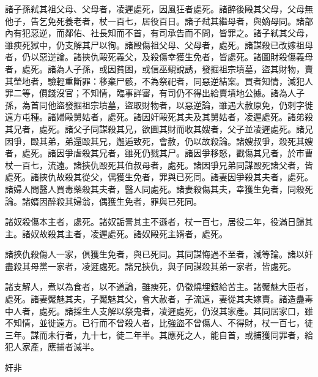 \begin{pinyinscope}
 諸子孫弒其祖父母、父母者，凌遲處死，因風狂者處死。諸醉後毆其父母，父母無他子，告乞免死養老者，杖一百七，居役百日。諸子弒其繼母者，與嫡母同。諸部內有犯惡逆，而鄰佑、社長知而不首，有司承告而不問，皆罪之。諸子弒其父母，雖瘐死獄中，仍支解其尸以徇。諸毆傷祖父母、父母者，處死。諸謀殺已改嫁祖母者，仍以惡逆論。諸挾仇毆死義父，及殺傷幸獲生免者，皆處死。諸圖財殺傷義母者，處死。諸為人子孫，或因貧困，或信巫覡說誘，發掘祖宗墳墓，盜其財物，賣其塋地者，驗輕重斷罪：移棄尸骸，不為祭祀者，同惡逆結案。買者知情，減犯人罪二等，價錢沒官；不知情，臨事詳審，有司仍不得出給賣墳地公據。諸為人子孫，為首同他盜發掘祖宗墳墓，盜取財物者，以惡逆論，雖遇大赦原免，仍刺字徙遠方屯種。諸婦毆舅姑者，處死。諸因奸毆死其夫及其舅姑者，凌遲處死。諸弟殺其兄者，處死。諸父子同謀殺其兄，欲圖其財而收其嫂者，父子並凌遲處死。諸兄因爭，毆其弟，弟還毆其兄，邂逅致死，會赦，仍以故殺論。諸嫂叔爭，殺死其嫂者，處死。諸因爭虐殺其兄者，雖死仍戮其尸。諸因爭移怒，戳傷其兄者，於市曹杖一百七，流遠。諸挾仇毆死其伯叔母者，處死。諸因爭兄弟同謀毆死諸父者，皆處死。諸挾仇故殺其從父，偶獲生免者，罪與已死同。諸妻因爭殺其夫者，處死。諸婦人問醫人買毒藥殺其夫者，醫人同處死。諸妻殺傷其夫，幸獲生免者，同殺死論。諸婿因醉殺其婦翁，偶獲生免者，罪與已死同。



 諸奴殺傷本主者，處死。諸奴詬詈其主不遜者，杖一百七，居役二年，役滿日歸其主。諸奴故殺其主者，凌遲處死。諸奴毆死主婿者，處死。



 諸挾仇殺傷人一家，俱獲生免者，與已死同。其同謀悔過不至者，減等論。諸以奸盡殺其母黨一家者，凌遲處死。諸兄挾仇，與子同謀殺其弟一家者，皆處死。



 諸支解人，煮以為食者，以不道論，雖瘐死，仍徵燒埋銀給苦主。諸魘魅大臣者，處死。諸妻魘魅其夫，子魘魅其父，會大赦者，子流遠，妻從其夫嫁賣。諸造蠱毒中人者，處死。諸採生人支解以祭鬼者，凌遲處死，仍沒其家產。其同居家口，雖不知情，並徙遠方。已行而不曾殺人者，比強盜不曾傷人、不得財，杖一百七，徒三年。謀而未行者，九十七，徒二年半。其應死之人，能自首，或捕獲同罪者，給犯人家產，應捕者減半。



 奸非




\end{pinyinscope}
